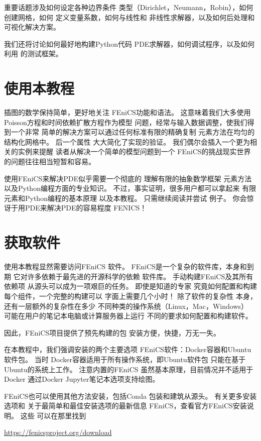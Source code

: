 \noindent
重要话题涉及如何设定各种边界条件
类型（Dirichlet，Neumann，Robin），如何创建网格，如何
定义变量系数，如何与线性和
非线性求解器，以及如何后处理和可视化解决方案。

我们还将讨论如何最好地构建Python代码
PDE求解器，如何调试程序，以及如何利用
的测试框架。

\section{使用本教程}

插图的数学保持简单，更好地关注
FEniCS功能和语法。 这意味着我们大多使用
Poisson方程和时间依赖扩散方程作为模型
问题，经常与输入数据调整，使我们得到一个非常
简单的解决方案可以通过任何标准有限的精确复制
元素方法在均匀的结构化网格中。 后一个属性
大大简化了实现的验证。
我们偶尔会插入一个更为相关的实例来提醒
读者从解决一个简单的模型问题到一个
FEniCS的挑战现实世界的问题往往相当短暂和容易。

使用FEniCS来解决PDE似乎需要一个彻底的
理解有限的抽象数学框架
元素方法以及Python编程方面的专业知识。
不过，事实证明，很多用户都可以拿起来
有限元素和Python编程的基本原理
以及本教程。 只需继续阅读并尝试
例子。 你会惊讶于用PDE来解决PDE的容易程度
FENICS！

\section{获取软件}

使用本教程显然需要访问FEniCS
软件。 FEniCS是一个复杂的软件库，本身和到期
它对许多依赖于最先进的开源科学的依赖
软件库。 手动构建FEniCS及其所有依赖项
从源头可以成为一项艰巨的任务。 即使是知道的专家
究竟如何配置和构建每个组件，一个完整的构建可以
字面上需要几个小时！ 除了软件的复杂性
本身，还有一层额外的复杂性在多少
不同种类的操作系统（Linux，Mac，Windows）
可能在用户的笔记本电脑或计算服务器上运行
不同的要求如何配置和构建软件。


因此，FEniCS项目提供了预先构建的包
安装方便，快捷，万无一失。

\begin{notice}[FEniCS下载和安装]
在本教程中，我们强调安装的两个主要选项
FEniCS软件：Docker容器和Ubuntu软件包。 当时
Docker容器适用于所有操作系统，即Ubuntu软件包
只能在基于Ubuntu的系统上工作。 注意内置的FEniCS
虽然基本原理，目前情况并不适用于Docker
通过Docker Jupyter笔记本选项支持绘图。

FEniCS也可以使用其他方法安装，包括Conda
包装和建筑从源头。 有关更多安装选项和
关于最简单和最佳安装选项的最新信息
FEniCS，查看官方FEniCS安装说明。 这些
可以在那里找到
\begin{center}
  \url{https://fenicsproject.org/download}
\end{center}
\end{notice}

